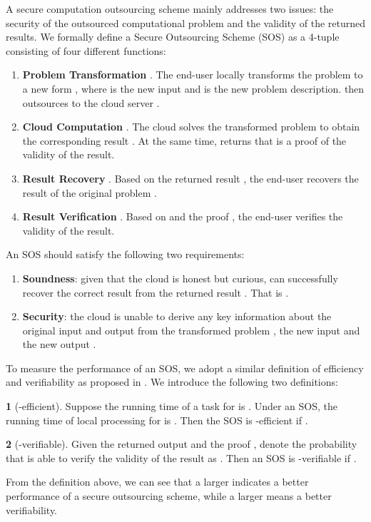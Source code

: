 \documentclass[english,draftcls,onecolumn,11pt]{IEEEtran}
\theoremstyle{definition}
\newtheorem{defn}{\protect\definitionname}
\theoremstyle{plain}
\theoremstyle{plain}
\theoremstyle{definition}
\providecommand{\definitionname}{Definition}
\begin{document}
A secure computation outsourcing scheme mainly addresses two issues:
the security of the outsourced computational problem and the validity
of the returned results. We formally define a Secure Outsourcing Scheme
(SOS) as a 4-tuple 
consisting of four different functions:
\begin{enumerate}
\item \textbf{Problem Transformation} .
The end-user  locally transforms the problem 
to a new form , where  is the new input
and  is the new problem description.  then outsources 
to the cloud server .
\item \textbf{Cloud Computation} .
The cloud  solves the transformed problem  to
obtain the corresponding result . At the same time, 
returns  that is a proof of the validity of the result.
\item \textbf{Result Recovery} . Based
on the returned result , the end-user  recovers the result
 of the original problem .
\item \textbf{Result Verification} .
Based on  and the proof , the end-user 
verifies the validity of the result.
\end{enumerate}
An SOS should satisfy the following two requirements:
\begin{enumerate}
\item \textbf{Soundness}: given that the cloud is honest but curious, 
can successfully recover the correct result  from the returned
result . That is .
\item \textbf{Security}: the cloud is unable to derive any key information
about the original input  and output  from the
transformed problem , the new input  and the new
output . 
\end{enumerate}
To measure the performance of an SOS, we adopt a similar definition
of efficiency and verifiability as proposed in \cite{hohenberger2005securely}.
We introduce the following two definitions:
\begin{defn}[-efficient]
\label{def:efficient} Suppose the running time of a task  for
 is . Under an SOS, the running time of local processing
for  is . Then the SOS is -efficient if .
\end{defn}

\begin{defn}[-verifiable]
\label{def:checkable} Given the returned output  and the
proof , denote the probability that  is able to verify
the validity of the result  as . Then an SOS is -verifiable
if .
\end{defn}
From the definition above, we can see that a larger  indicates
a better performance of a secure outsourcing scheme, while a larger
 means a better verifiability.
\end{document}
